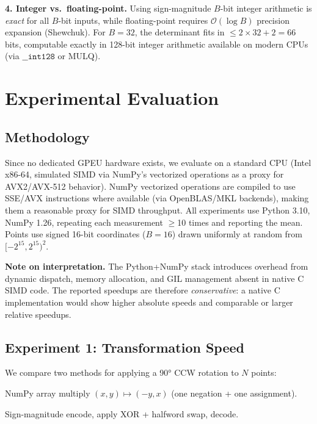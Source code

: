\documentclass[11pt,letterpaper]{article}
\newcommand{\cO}{\mathcal{O}}
\begin{document}
\textbf{4. Integer vs.\ floating-point.}  Using sign-magnitude $B$-bit integer
arithmetic is \emph{exact} for all $B$-bit inputs, while floating-point requires
$\cO(\log B)$ precision expansion (Shewchuk).  For $B=32$, the determinant fits in
$\le 2\times 32+2 = 66$ bits, computable exactly in 128-bit integer arithmetic available
on modern CPUs (via $\mathtt{\_\_int128}$ or MULQ).

\section{Experimental Evaluation}\label{sec:experiments}

\subsection{Methodology}

Since no dedicated GPEU hardware exists, we evaluate on a standard CPU (Intel x86-64,
simulated SIMD via NumPy's vectorized operations as a proxy for AVX2/AVX-512 behavior).
NumPy vectorized operations are compiled to use SSE/AVX instructions where available
(via OpenBLAS/MKL backends), making them a reasonable proxy for SIMD throughput.
All experiments use Python 3.10, NumPy 1.26, repeating each measurement $\ge$10 times
and reporting the mean.  Points use signed 16-bit coordinates ($B=16$) drawn uniformly
at random from $[-2^{15},2^{15})^2$.

\textbf{Note on interpretation.}  The Python+NumPy stack introduces overhead from
dynamic dispatch, memory allocation, and GIL management absent in native C SIMD code.
The reported speedups are therefore \emph{conservative}: a native C implementation would
show higher absolute speeds and comparable or larger relative speedups.

\subsection{Experiment 1: Transformation Speed}

We compare two methods for applying a 90° CCW rotation to $N$ points:
\begin{description}[nosep]
\item[\textbf{Standard}:] NumPy array multiply $(x,y)\mapsto(-y,x)$ (one negation + one assignment).
\item[\textbf{XOR+Swap}:] Sign-magnitude encode, apply XOR + halfword swap, decode.
\end{description}
\end{document}
